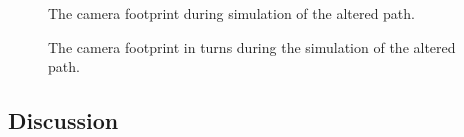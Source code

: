 \begin{figure}[!ht]
    \centering
    \caption{The camera footprint during simulation of the altered path.}
	\label{fig:both_camera_path}
\end{figure}

\begin{figure}[!ht]
    \centering
    \caption{The camera footprint in turns during the simulation of the altered path.}
	\label{fig:both_camera_turns}
\end{figure}


\subsection{Discussion}

